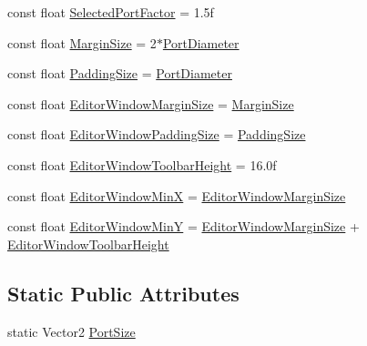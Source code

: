 \begin{DoxyCompactItemize}
const float \hyperlink{classi_c_s___editor_config_af22b9eb56e77a058c21e2571a29995ca}{Selected\+Port\+Factor} = 1.\+5f
\item 
const float \hyperlink{classi_c_s___editor_config_abaddcfa3ae1e2f0ba89ecf284ab14365}{Margin\+Size} = 2$\ast$\hyperlink{classi_c_s___editor_config_ab189cc729baea3cf886be53355f172b1}{Port\+Diameter}
\item 
const float \hyperlink{classi_c_s___editor_config_ad047795d30cd3a4ad9deadef5cd03071}{Padding\+Size} = \hyperlink{classi_c_s___editor_config_ab189cc729baea3cf886be53355f172b1}{Port\+Diameter}
\item 
const float \hyperlink{classi_c_s___editor_config_a70ca19259290ebd2e0893309f87a8b1b}{Editor\+Window\+Margin\+Size} = \hyperlink{classi_c_s___editor_config_abaddcfa3ae1e2f0ba89ecf284ab14365}{Margin\+Size}
\item 
const float \hyperlink{classi_c_s___editor_config_a5acf6d9a9b1ac2e174f64cfd3ae4927a}{Editor\+Window\+Padding\+Size} = \hyperlink{classi_c_s___editor_config_ad047795d30cd3a4ad9deadef5cd03071}{Padding\+Size}
\item 
const float \hyperlink{classi_c_s___editor_config_a574d81bc08ad93a815475c18ec557ba4}{Editor\+Window\+Toolbar\+Height} = 16.\+0f
\item 
const float \hyperlink{classi_c_s___editor_config_ab348702d8e8329b8497e4b3ac6fab690}{Editor\+Window\+Min\+X} = \hyperlink{classi_c_s___editor_config_a70ca19259290ebd2e0893309f87a8b1b}{Editor\+Window\+Margin\+Size}
\item 
const float \hyperlink{classi_c_s___editor_config_a6485bb3d4e7e1bcbc091f3fec9fc295b}{Editor\+Window\+Min\+Y} = \hyperlink{classi_c_s___editor_config_a70ca19259290ebd2e0893309f87a8b1b}{Editor\+Window\+Margin\+Size} + \hyperlink{classi_c_s___editor_config_a574d81bc08ad93a815475c18ec557ba4}{Editor\+Window\+Toolbar\+Height}
\end{DoxyCompactItemize}
\subsection*{Static Public Attributes}
\begin{DoxyCompactItemize}
\item 
static Vector2 \hyperlink{classi_c_s___editor_config_acad057d1aa3ecc6b038d3fa545c2b973}{Port\+Size}
\end{DoxyCompactItemize}
